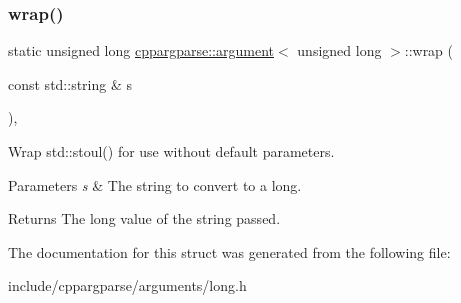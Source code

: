 \subsubsection{\texorpdfstring{wrap()}{wrap()}}
{\footnotesize\ttfamily static unsigned long \hyperlink{structcppargparse_1_1argument}{cppargparse\+::argument}$<$ unsigned long $>$\+::wrap (\begin{DoxyParamCaption}\item[{const std\+::string \&}]{s }\end{DoxyParamCaption})\hspace{0.3cm}{\ttfamily [inline]}, {\ttfamily [static]}}



Wrap std\+::stoul() for use without default parameters. 


\begin{DoxyParams}{Parameters}
{\em s} & The string to convert to a long.\\
\hline
\end{DoxyParams}
\begin{DoxyReturn}{Returns}
The long value of the string passed. 
\end{DoxyReturn}


The documentation for this struct was generated from the following file\+:\begin{DoxyCompactItemize}
\item 
include/cppargparse/arguments/long.\+h\end{DoxyCompactItemize}
